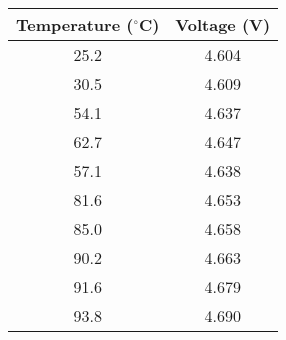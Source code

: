\begin{tabular}{|c|c|} %
        \hline
        \textbf{Temperature ($^{\circ}$C)} & \textbf{Voltage (V)} \\ %
        \hline
        25.2 & 4.604 \\ %
        \hline
        30.5 & 4.609 \\
        \hline
        54.1 & 4.637\\
        \hline
        62.7 & 4.647 \\
        \hline
        57.1 & 4.638 \\
        \hline
        81.6 & 4.653 \\
        \hline
        85.0 & 4.658 \\
        \hline
        90.2 & 4.663 \\
        \hline
        91.6 & 4.679\\
        \hline
        93.8 & 4.690 \\
        \hline
    \end{tabular}
